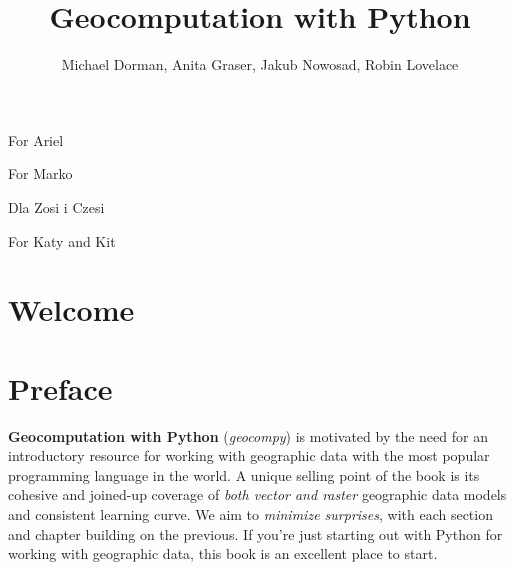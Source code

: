 \documentclass[
  letterpaper,
]{krantz}
\title{Geocomputation with Python}
\author{Michael Dorman, Anita Graser, Jakub Nowosad, Robin Lovelace}
\date{}
\renewcommand*\contentsname{Table of contents}
\newcommand\contentsname{Table of contents}
\begin{document}
\maketitle


\thispagestyle{empty}

\vspace*{\fill}

For Ariel

\vspace*{2cm}
For Marko

\vspace*{2cm}
Dla Zosi i Czesi 

\vspace*{2cm}
For Katy and Kit


\setlength{\abovedisplayskip}{-5pt}
\setlength{\abovedisplayshortskip}{-5pt}

\renewcommand*\contentsname{Table of contents}
{
\hypersetup{linkcolor=}
\setcounter{tocdepth}{2}
\tableofcontents
}


\chapter*{Welcome}\label{welcome}



\chapter*{Preface}\label{preface}


\textbf{Geocomputation with Python} (\emph{geocompy}) is motivated by
the need for an introductory resource for working with geographic data
with the most popular programming language in the world. A unique
selling point of the book is its cohesive and joined-up coverage of
\emph{both vector and raster} geographic data models and consistent
learning curve. We aim to \emph{minimize surprises}, with each section
and chapter building on the previous. If you're just starting out with
Python for working with geographic data, this book is an excellent place
to start.
\end{document}
